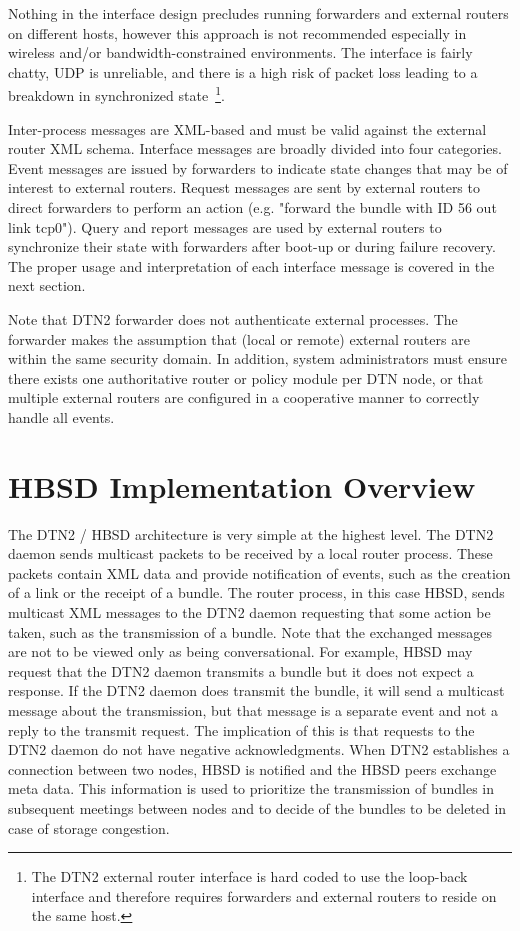 Nothing in the interface design precludes running forwarders and external routers on different hosts, however this approach is not recommended especially in wireless and/or bandwidth-constrained environments. The interface is fairly chatty, UDP is unreliable, and there is a high risk of packet loss leading to a breakdown in synchronized state~\footnote{The DTN2 external router interface is hard coded to use the loop-back interface and therefore requires forwarders and external routers to reside on the same host.}.

Inter-process messages are XML-based and must be valid against the external router XML schema. Interface messages are broadly divided into four categories. Event messages are issued by forwarders to indicate state changes that may be of interest to external routers. Request messages are sent by external routers to direct forwarders to perform an action (e.g. "forward the bundle with ID 56 out link tcp0"). Query and report messages are used by external routers to synchronize their state with forwarders after boot-up or during failure recovery. The proper usage and interpretation of each interface message is covered in the next section.

Note that DTN2 forwarder does not authenticate external processes. The forwarder makes the assumption that (local or remote) external routers are within the same security domain. In addition, system administrators must ensure there exists one authoritative router or policy module per DTN node, or that multiple external routers are configured in a cooperative manner to correctly handle all events.


\section{HBSD Implementation Overview}

The DTN2 / HBSD architecture is very simple at the highest level. The DTN2 daemon sends multicast packets 
to be received by a local router process. These packets contain XML
data and provide notification of events, such as the creation of a link or the receipt of a bundle.
The router process, in this case HBSD, sends multicast XML messages to the DTN2 daemon requesting that
some action be taken, such as the transmission of a bundle. Note that the exchanged messages
are not to be viewed only as being conversational. For example, HBSD may request that the DTN2 daemon
transmits a bundle but it does not expect a response. If the DTN2 daemon does transmit the bundle, it will send
a multicast message about the transmission, but that message is a separate event and not a
reply to the transmit request. The implication of this is that requests to the DTN2 daemon do not have negative
acknowledgments. When DTN2 establishes a connection between two nodes, HBSD is notified and the HBSD
peers exchange meta data. This information is used to prioritize the transmission of bundles in
subsequent meetings between nodes and to decide of the bundles to be deleted in case of storage congestion. 

